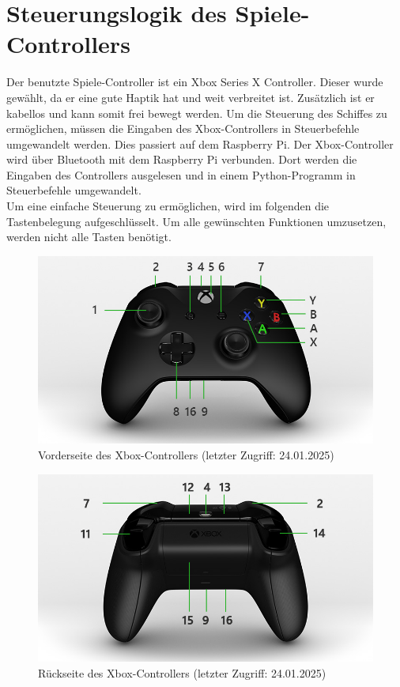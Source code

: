 \section{Steuerungslogik des Spiele-Controllers}
Der benutzte Spiele-Controller ist ein Xbox Series X Controller. Dieser wurde gewählt, da er eine gute Haptik hat und weit
verbreitet ist. Zusätzlich ist er kabellos und kann somit frei bewegt werden. Um die Steuerung des Schiffes zu
ermöglichen, müssen die Eingaben des Xbox-Controllers in Steuerbefehle umgewandelt werden. Dies passiert auf dem 
Raspberry Pi. Der Xbox-Controller wird über Bluetooth mit dem Raspberry Pi verbunden. Dort werden die Eingaben des Controllers
ausgelesen und in einem Python-Programm in Steuerbefehle umgewandelt. \\
Um eine einfache Steuerung zu ermöglichen, wird im folgenden die Tastenbelegung aufgeschlüsselt.
Um alle gewünschten Funktionen umzusetzen, werden nicht alle Tasten benötigt. 

\begin{figure}[H]
    \centering
    \includegraphics[scale=0.5]{images/vorderseite.jpg}
    \caption{Vorderseite des Xbox-Controllers \cite{XboxController}(letzter Zugriff: 24.01.2025)}
    \label{fig:vorderseite}
\end{figure}

\begin{figure}[H]
    \centering
    \includegraphics[scale=0.5]{images/rueckseite.jpg}
    \caption{Rückseite des Xbox-Controllers \cite{XboxController}(letzter Zugriff: 24.01.2025)}
    \label{fig:rueckseite}
\end{figure}

